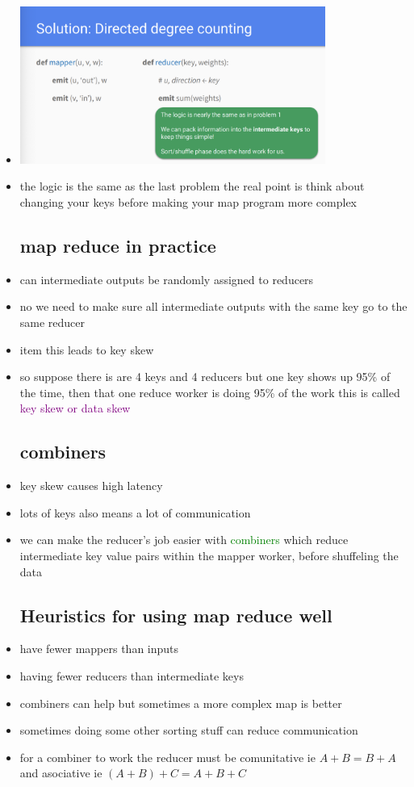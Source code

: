 \documentclass{article}
\begin{document}
\begin{itemize}
\item \includegraphics[width=10cm]{images/Screenshot 2023-05-08 at 5.10.06 PM.png}
\item the logic is the same as the last problem the real point is think about changing your keys before making your map program more complex
\subsection*{map reduce in practice}
\item can intermediate outputs be randomly assigned to reducers
\item no we need to make sure all intermediate outputs with the same key go to the same reducer
\item item this leads to key skew
\item so suppose there is are 4 keys and 4 reducers but one key shows up 95\% of the time, then that one reduce worker is doing 95\% of the work this is called \textcolor{purple}{key skew or data skew}
\subsection*{combiners}
\item key skew causes high latency
\item lots of keys also means a lot of communication 
\item we can make the reducer's job easier with \textcolor{green}{combiners} which reduce intermediate key value pairs within the mapper worker, before shuffeling the data
\subsection*{Heuristics for using map reduce well}
\item have fewer mappers than inputs 
\item having fewer reducers than intermediate keys
\item combiners can help but sometimes a more complex map is better 
\item sometimes doing some other sorting stuff can reduce communication 
\item for a combiner to work the reducer must be comunitative ie $A+B=B+A$ and asociative ie $(A+B)+C=A+B+C$

\end{itemize}
\end{document}
